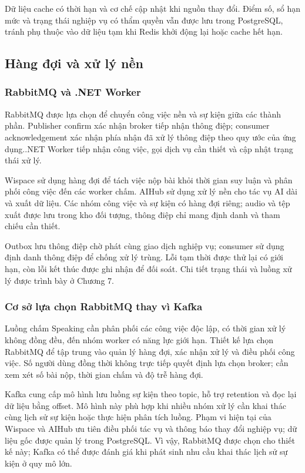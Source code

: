Dữ liệu cache có thời hạn và cơ chế cập nhật khi nguồn thay đổi. Điểm số, sổ hạn mức và trạng thái nghiệp vụ có thẩm quyền vẫn được lưu trong PostgreSQL, tránh phụ thuộc vào dữ liệu tạm khi Redis khởi động lại hoặc cache hết hạn.

\subsection{Hàng đợi và xử lý nền}
\subsubsection{RabbitMQ và .NET Worker}

RabbitMQ được lựa chọn để chuyển công việc nền và sự kiện giữa các thành phần. Publisher confirm xác nhận broker tiếp nhận thông điệp; consumer acknowledgement xác nhận phía nhận đã xử lý thông điệp theo quy ước của ứng dụng..NET Worker tiếp nhận công việc, gọi dịch vụ cần thiết và cập nhật trạng thái xử lý.

Wispace sử dụng hàng đợi để tách việc nộp bài khỏi thời gian suy luận và phân phối công việc đến các worker chấm. AIHub sử dụng xử lý nền cho tác vụ AI dài và xuất dữ liệu. Các nhóm công việc và sự kiện có hàng đợi riêng; audio và tệp xuất được lưu trong kho đối tượng, thông điệp chỉ mang định danh và tham chiếu cần thiết.

Outbox lưu thông điệp chờ phát cùng giao dịch nghiệp vụ; consumer sử dụng định danh thông điệp để chống xử lý trùng. Lỗi tạm thời được thử lại có giới hạn, còn lỗi kết thúc được ghi nhận để đối soát. Chi tiết trạng thái và luồng xử lý được trình bày ở Chương 7.

\subsubsection{Cơ sở lựa chọn RabbitMQ thay vì Kafka}

Luồng chấm Speaking cần phân phối các công việc độc lập, có thời gian xử lý không đồng đều, đến nhóm worker có năng lực giới hạn. Thiết kế lựa chọn RabbitMQ để tập trung vào quản lý hàng đợi, xác nhận xử lý và điều phối công việc. Số người dùng đồng thời không trực tiếp quyết định lựa chọn broker; cần xem xét số bài nộp, thời gian chấm và độ trễ hàng đợi.

Kafka cung cấp mô hình lưu luồng sự kiện theo topic, hỗ trợ retention và đọc lại dữ liệu bằng offset. Mô hình này phù hợp khi nhiều nhóm xử lý cần khai thác cùng lịch sử sự kiện hoặc thực hiện phân tích luồng. Phạm vi hiện tại của Wispace và AIHub ưu tiên điều phối tác vụ và thông báo thay đổi nghiệp vụ; dữ liệu gốc được quản lý trong PostgreSQL. Vì vậy, RabbitMQ được chọn cho thiết kế này; Kafka có thể được đánh giá khi phát sinh nhu cầu khai thác lịch sử sự kiện ở quy mô lớn.

